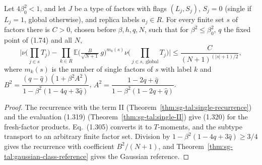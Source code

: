 \begin{theorem}
\label{thm:sg-tal:prop-1105}
\leanok
{}
Let $4\beta_0^2<1$, and let $J$ be a type of factors with flags $(L_j,S_j)$, $S_j=0$ (single if $L_j=1$,
global otherwise), and replica labels $a_j\in R$. For every finite set $s$ of factors there is $C>0$,
chosen before $\beta,h,q,N$, such that for $\beta^2\le\beta_0^2$, $q$ the fixed point of (1.74) and all $N$,
\[
 \Big|\nu\Big(\prod_{j\in s}T_j\Big)-\prod_{k\in R}\mathbb E\Big(\tfrac{B}{\sqrt{N+1}}\,g\Big)^{m_k(s)}
 \nu\Big(\prod_{j\in s,\ \text{global}}T_j\Big)\Big|\le\frac{C}{(N+1)^{(|s|+1)/2}},
\]
where $m_k(s)$ is the number of single factors of $s$ with label $k$ and
$B^2=\dfrac{(q-\hat q)(1+\beta^2A^2)}{1-\beta^2(1-4q+3\hat q)}$, $A^2=\dfrac{1-2q+\hat q}{1-\beta^2(1-2q+\hat q)}$.
\end{theorem}
\begin{proof}
\leanok
The recurrence with the term II (Theorem~\ref{thm:sg-tal:single-recurrence}) and the evaluation (1.319)
(Theorem~\ref{thm:sg-tal:single-II}) give (1.320) for the fresh-factor products. Eq.~(1.305)
converts it to $T$-moments, and the subtype transport to an arbitrary finite factor set. Division by
$1-\beta^2(1-4q+3\hat q)\ge3/4$ gives the recurrence with coefficient $B^2/(N+1)$, and
Theorem~\ref{thm:sg-tal:gaussian-class-reference} gives the Gaussian reference.
\end{proof}


